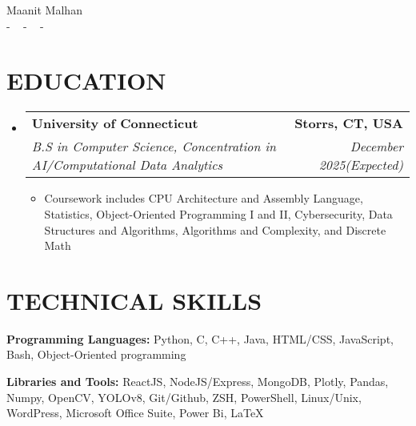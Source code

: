 \documentclass[letterpaper,11pt]{article}
\makeatletter
\newcommand{\resumeItem}[1]{
  \item\small{
    {#1 \vspace{-1pt}}
  }
}
\newcommand{\resumeSubheading}[4]{
  \vspace{-2pt}\item
    \begin{tabular*}{1.0\textwidth}[t]{l@{\extracolsep{\fill}}r}
      \textbf{\large#1} & \textbf{\small #2} \\
      \textit{\large#3} & \textit{\small #4} \\
      
    \end{tabular*}\vspace{-7pt}
}
\newcommand{\resumeSubHeadingListStart}{\begin{itemize}[leftmargin=0.0in, label={}]}
\newcommand{\resumeSubHeadingListEnd}{\end{itemize}}
\newcommand{\resumeItemListStart}{\begin{itemize}[leftmargin=0.1in]}
\newcommand{\resumeItemListEnd}{\end{itemize}\vspace{-5pt}}
\makeatother
\begin{document}


\begin{center}
    {\huge Maanit Malhan} \\ \vspace{2pt} 
    \small{-}
    \href{mailto:[maanitmalhan@gmail.com]}{\color{blue}{maanitmalhan@gmail.com}} ~ 
    \small{-}
    \href{[https://www.linkedin.com/in/maanit-malhan/]}{ \color{blue}{https://www.linkedin.com/in/maanit-malhan}}  ~
    \small{-}
    \href{[Maanit Malhan]}{ \color{blue}{https://github.com/maanitmalhan}} ~
    \vspace{-7pt}
\end{center}

\section{\color{airforceblue}EDUCATION}
  \resumeSubHeadingListStart
    \resumeSubheading
      {University of Connecticut}{Storrs, CT, USA}
      {B.S in Computer Science, Concentration in AI/Computational Data Analytics}{December 2025(Expected)}
       \resumeItemListStart
            \resumeItem{\normalsize{Coursework includes CPU Architecture and Assembly Language, Statistics, Object-Oriented Programming I and II, Cybersecurity, Data Structures and Algorithms, Algorithms and Complexity, and Discrete Math}}
            
      \resumeItemListEnd  
    \vspace{-4pt}
     
  \resumeSubHeadingListEnd
  \vspace{-10pt}

\section{\color{airforceblue}TECHNICAL SKILLS}
 \begin{itemize}[leftmargin=0in, label={}]
    \small{\item{
     \textbf{\normalsize{Programming Languages:}}{ \normalsize{Python, C, C++, Java, HTML/CSS, JavaScript, Bash, Object-Oriented programming}} \\
      \vspace{1.2pt}
      
     \textbf{\normalsize{Libraries and Tools:}}{ \normalsize{ReactJS, NodeJS/Express, MongoDB, Plotly, Pandas, Numpy, OpenCV, YOLOv8, Git/Github, ZSH, PowerShell, Linux/Unix, WordPress, Microsoft Office Suite, Power Bi, LaTeX}} \\
      \vspace{1.2pt}
      
     
     }}
 \end{itemize}
 \vspace{-16pt}
 
\end{document}
